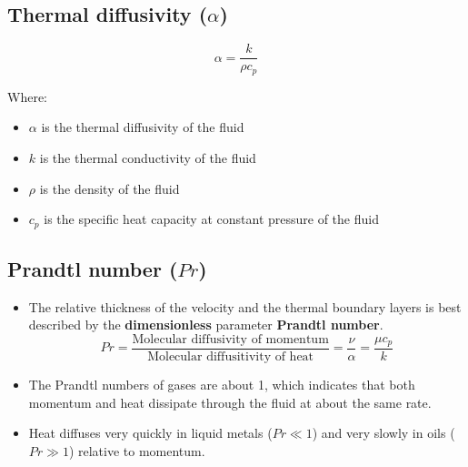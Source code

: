 \documentclass[11pt]{article}
\begin{document}
\subsection{Thermal diffusivity (\(\alpha\))}
\label{sec:org16962bb}
\[\alpha = \frac{k}{\rho c_p}\]

Where:
\begin{itemize}
\item \(\alpha\) is the thermal diffusivity of the fluid
\item \(k\) is the thermal conductivity of the fluid
\item \(\rho\) is the density of the fluid
\item \(c_p\) is the specific heat capacity at constant pressure of the fluid
\end{itemize}

\subsection{Prandtl number (\(Pr\))}
\label{sec:org60bed78}
\begin{itemize}
\item The relative thickness of the velocity and the thermal boundary layers is best described by the \textbf{dimensionless} parameter \textbf{Prandtl number}.
\[Pr = \frac{\text{Molecular diffusivity of momentum}}{\text{Molecular diffusitivity of heat}} = \frac{\nu}{\alpha} = \frac{\mu c_p}{k}\]

\item The Prandtl numbers of gases are about 1, which indicates that both momentum and heat dissipate through the fluid at about the same rate.
\item Heat diffuses very quickly in liquid metals (\(Pr \ll 1\)) and very slowly in oils (\(Pr \gg 1\)) relative to momentum.
\end{itemize}

 \newpage
\end{document}
